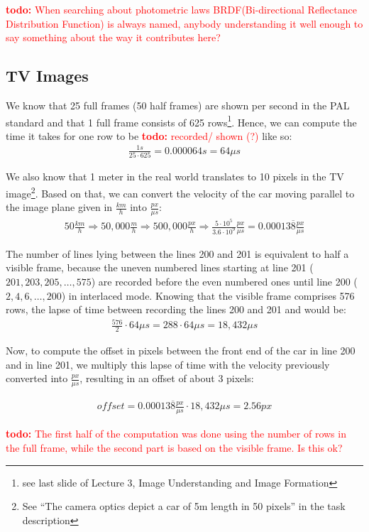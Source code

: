 \documentclass[a4paper,12pt]{article}
\newcommand{\twodo}[1]{\textcolor{red}{\textbf{todo:} #1}}
\begin{document}
	\twodo{When searching about photometric laws BRDF(Bi-directional Reflectance Distribution Function) is always named, anybody understanding it well enough to say something about the way it contributes here? }
		
	\subsection{TV Images}
	We know that 25 full frames (50 half frames) are shown per second in the PAL standard and that 1 full frame consists of 625 rows\footnote{see last slide of Lecture 3, Image Understanding and Image Formation}. Hence, we can compute the time it takes for one row to be \twodo{recorded/ shown (?)} like so:
	\begin{align*}
		\frac{1 s}{25 \cdot 625} = 0.000064 s = 64\mu s
	\end{align*}
	
	We also know that 1 meter in the real world translates to 10 pixels in the TV image\footnote{See ``The camera optics depict a car of 5m length in 50 pixels'' in the task description}. Based on that, we can convert the velocity of the car moving parallel to the image plane given in $\frac{km}{h}$ into $\frac{px}{\mu s}$:
	\begin{align*}
		50 \frac{km}{h} \Rightarrow 50,000 \frac{m}{h} \Rightarrow 500,000 \frac{px}{h} \Rightarrow \frac{5 \cdot 10^{5}}{3.6 \cdot 10^{9}} \frac{px}{\mu s} = 0.00013\overline{8} \frac{px}{\mu s}
	\end{align*}
	
	The number of lines lying between the lines 200 and 201 is equivalent to half a visible frame, because the uneven numbered lines starting at line 201 ($201, 203, 205, \dots, 575$) are recorded before the even numbered ones until line 200 ($2, 4, 6, \dots, 200$) in interlaced mode. Knowing that the visible frame comprises 576 rows, the lapse of time between recording the lines 200 and 201 and would be:
	\begin{align*}
	\frac{576}{2} \cdot 64\mu s = 288 \cdot 64\mu s = 18,432 \mu s
	\end{align*}
	
	Now, to compute the offset in pixels between the front end of the car in line 200 and in line 201, we multiply this lapse of time with the velocity previously converted into $\frac{px}{\mu s}$, resulting in an offset of about 3 pixels:
	
	\begin{align*}
	\mathit{offset} = 0.00013\overline{8} \frac{px}{\mu s} \cdot 18,432 \mu s = 2.56 px
	\end{align*}
	
	\twodo{The first half of the computation was done using the number of rows in the full frame, while the second part is based on the visible frame. Is this ok?}
	
\end{document}

